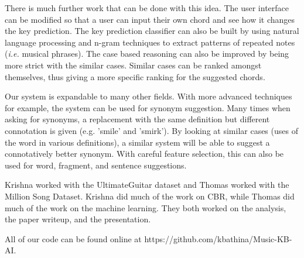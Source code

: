 \documentclass[letterpaper]{article}
\begin{document}
There is much further work that can be done with this idea. The user interface can be modified so that a user can input their own chord and see how it changes the key prediction. The key prediction classifier can also be built by using natural language processing and n-gram techniques to extract patterns of repeated notes (\textit{i.e.} musical phrases). The case based reasoning can also be improved by being more strict with the similar cases. Similar cases can be ranked amongst themselves, thus giving a more specific ranking for the suggested chords. 

Our system is expandable to many other fields. With more advanced techniques for example, the system can be used for synonym suggestion. Many times when asking for synonyms, a replacement with the same definition but different connotation is given (e.g. 'smile' and 'smirk'). By looking at similar cases (uses of the word in various definitions), a similar system will be able to suggest a connotatively better synonym. With careful feature selection, this can also be used for word, fragment, and sentence suggestions. 

\bigskip
Krishna worked with the UltimateGuitar dataset and Thomas worked with the Million Song Dataset. Krishna did much of the work on CBR, while Thomas did much of the work on the machine learning.  They both worked on the analysis, the paper writeup, and the presentation.

All of our code can be found online at https://github.com/kbathina/Music-KB-AI.  



\end{document}
